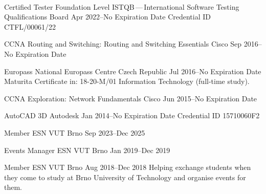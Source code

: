 
\vspace{-53em}


\cvevent
{Certified Tester Foundation Level}
{ISTQB\textsuperscript\textregistered\,---\,International Software Testing Qualifications Board}
{Apr 2022--No Expiration Date}
{}
\vspace{-.3em}
\small{Credential ID CTFL/00061/22}
\medskip

\cvevent
{CCNA Routing and Switching: Routing and Switching Essentials}
{Cisco}
{Sep 2016--No Expiration Date}
{}

\cvevent
{Europass}
{National Europass Centre Czech Republic}
{Jul 2016--No Expiration Date}
{}
\vspace{-.3em}
\small{Maturita Certificate in: 18-20-M/01 Information Technology (full-time study).}
\medskip

\cvevent
{CCNA Exploration: Network Fundamentals}
{Cisco}
{Jun 2015--No Expiration Date}
{}

\cvevent
{AutoCAD 3D}
{Autodesk}
{Jan 2014--No Expiration Date}
{}
\vspace{-.3em}
\small{Credential ID 15710060F2}









\cvevent
{Member}
{ESN VUT Brno}
{Sep 2023--Dec 2025}
{}

\cvevent
{Events Manager}
{ESN VUT Brno}
{Jan 2019--Dec 2019}
{}

\cvevent
{Member}
{ESN VUT Brno}
{Aug 2018--Dec 2018}
{}
\vspace{-.3em}
\small{Helping exchange students when they come to study at Brno University of Technology and organise events for them.}
